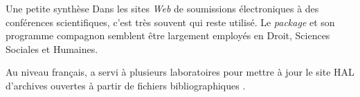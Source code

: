 \documentclass[pdf]{beamer}
\begin{document}
\begin{frame}{Une petite synthèse}
Dans les sites \foreignlanguage{english}{\emph{Web}} de soumissions
électroniques à des conférences scientifiques, c'est très souvent
\foreignlanguage{english}{\BibTeX} qui reste utilisé. Le
\foreignlanguage{english}{\emph{package} } et son
programme compagnon \foreignlanguage{english}{} semblent être
largement employés en Droit, Sciences Sociales et Humaines.\pause

Au niveau français, \foreignlanguage{english}{\mlBibTeX} a servi à plusieurs
laboratoires pour mettre à jour le site HAL d'archives ouvertes à partir de
fichiers bibliographiques \foreignlanguage{english}{}.
\end{frame}
\end{document}
